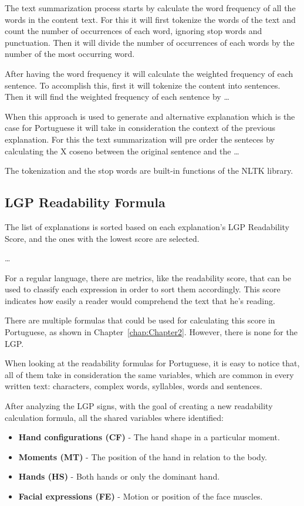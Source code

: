 The text summarization process starts by calculate the word frequency of all the words in the content text.
For this it will first tokenize the words of the text and count the number of occurrences of each word, ignoring stop words and punctuation.
Then it will divide the number of occurrences of each words by the number of the most occurring word.

After having the word frequency it will calculate the weighted frequency of each sentence.
To accomplish this, first it will tokenize the content into sentences.
Then it will find the weighted frequency of each sentence by \dots

When this approach is used to generate and alternative explanation which is the case for Portuguese it will take in consideration the context of the previous explanation.
For this the text summarization will pre order the senteces by calculating the X  coseno between the original sentence and the \dots %

The tokenization and the stop words are built-in functions of the NLTK library.

\subsection{LGP Readability Formula}

The list of explanations is sorted based on each explanation's \gls{LGP} Readability Score, and the ones with the lowest score are selected.

\dots

For a regular language, there are metrics, like the readability score, that can be used to classify each expression in order to sort them accordingly.
This score indicates how easily a reader would comprehend the text that he's reading.

There are multiple formulas that could be used for calculating this score in Portuguese, as shown in Chapter~\ref{chap:Chapter2}.
However, there is none for the \gls{LGP}.

When looking at the readability formulas for Portuguese, it is easy to notice that, all of them take in consideration the same variables, which are common in every written text: characters, complex words, syllables, words and sentences.

After analyzing the \gls{LGP} signs, with the goal of creating a new readability calculation formula, all the shared variables where identified:

\begin{itemize}
    \item \textbf{Hand configurations (CF)} - The hand shape in a particular moment.
    \item \textbf{Moments (MT)} - The position of the hand in relation to the body.
    \item \textbf{Hands (HS)} - Both hands or only the dominant hand.
    \item \textbf{Facial expressions (FE)} - Motion or position of the face muscles.
\end{itemize}

